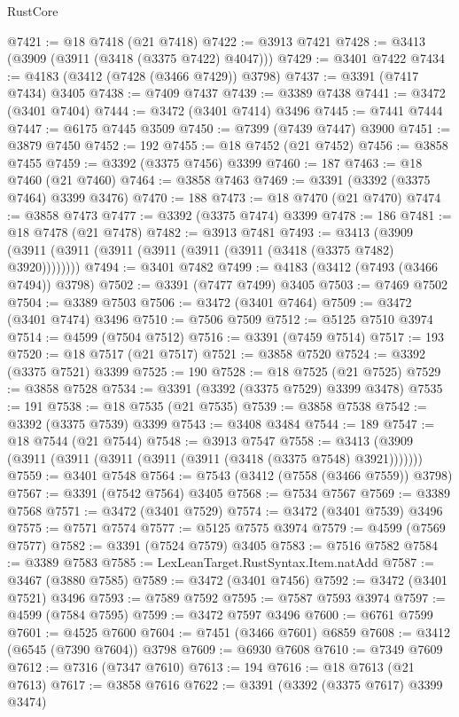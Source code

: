 \begin{lexlean}{RustCore}
\begin{coremodule}
@7421 := @18 @7418 (@21 @7418)
@7422 := @3913 @7421
@7428 := @3413 (@3909 (@3911 (@3418 (@3375 @7422) @4047)))
@7429 := @3401 @7422
@7434 := @4183 (@3412 (@7428 (@3466 @7429)) @3798)
@7437 := @3391 (@7417 @7434) @3405
@7438 := @7409 @7437
@7439 := @3389 @7438
@7441 := @3472 (@3401 @7404)
@7444 := @3472 (@3401 @7414) @3496
@7445 := @7441 @7444
@7447 := @6175 @7445 @3509
@7450 := @7399 (@7439 @7447) @3900
@7451 := @3879 @7450
@7452 := 192
@7455 := @18 @7452 (@21 @7452)
@7456 := @3858 @7455
@7459 := @3392 (@3375 @7456) @3399
@7460 := 187
@7463 := @18 @7460 (@21 @7460)
@7464 := @3858 @7463
@7469 := @3391 (@3392 (@3375 @7464) @3399 @3476)
@7470 := 188
@7473 := @18 @7470 (@21 @7470)
@7474 := @3858 @7473
@7477 := @3392 (@3375 @7474) @3399
@7478 := 186
@7481 := @18 @7478 (@21 @7478)
@7482 := @3913 @7481
@7493 := @3413 (@3909 (@3911 (@3911 (@3911 (@3911 (@3911 (@3911 (@3418 (@3375 @7482) @3920))))))))
@7494 := @3401 @7482
@7499 := @4183 (@3412 (@7493 (@3466 @7494)) @3798)
@7502 := @3391 (@7477 @7499) @3405
@7503 := @7469 @7502
@7504 := @3389 @7503
@7506 := @3472 (@3401 @7464)
@7509 := @3472 (@3401 @7474) @3496
@7510 := @7506 @7509
@7512 := @5125 @7510 @3974
@7514 := @4599 (@7504 @7512)
@7516 := @3391 (@7459 @7514)
@7517 := 193
@7520 := @18 @7517 (@21 @7517)
@7521 := @3858 @7520
@7524 := @3392 (@3375 @7521) @3399
@7525 := 190
@7528 := @18 @7525 (@21 @7525)
@7529 := @3858 @7528
@7534 := @3391 (@3392 (@3375 @7529) @3399 @3478)
@7535 := 191
@7538 := @18 @7535 (@21 @7535)
@7539 := @3858 @7538
@7542 := @3392 (@3375 @7539) @3399
@7543 := @3408 @3484
@7544 := 189
@7547 := @18 @7544 (@21 @7544)
@7548 := @3913 @7547
@7558 := @3413 (@3909 (@3911 (@3911 (@3911 (@3911 (@3911 (@3418 (@3375 @7548) @3921)))))))
@7559 := @3401 @7548
@7564 := @7543 (@3412 (@7558 (@3466 @7559)) @3798)
@7567 := @3391 (@7542 @7564) @3405
@7568 := @7534 @7567
@7569 := @3389 @7568
@7571 := @3472 (@3401 @7529)
@7574 := @3472 (@3401 @7539) @3496
@7575 := @7571 @7574
@7577 := @5125 @7575 @3974
@7579 := @4599 (@7569 @7577)
@7582 := @3391 (@7524 @7579) @3405
@7583 := @7516 @7582
@7584 := @3389 @7583
@7585 := LexLeanTarget.RustSyntax.Item.natAdd
@7587 := @3467 (@3880 @7585)
@7589 := @3472 (@3401 @7456)
@7592 := @3472 (@3401 @7521) @3496
@7593 := @7589 @7592
@7595 := @7587 @7593 @3974
@7597 := @4599 (@7584 @7595)
@7599 := @3472 @7597 @3496
@7600 := @6761 @7599
@7601 := @4525 @7600
@7604 := @7451 (@3466 @7601) @6859
@7608 := @3412 (@6545 (@7390 @7604)) @3798
@7609 := @6930 @7608
@7610 := @7349 @7609
@7612 := @7316 (@7347 @7610)
@7613 := 194
@7616 := @18 @7613 (@21 @7613)
@7617 := @3858 @7616
@7622 := @3391 (@3392 (@3375 @7617) @3399 @3474)

\end{coremodule}
\end{lexlean}

